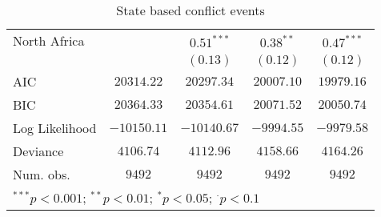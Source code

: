 \begin{sidewaystable}
\begin{center}
{\begin{tabular}{l c c c c}
North Africa                             &               & $0.51^{***}$  & $0.38^{**}$   & $0.47^{***}$    \\
                                         &               & $(0.13)$      & $(0.12)$      & $(0.12)$        \\
\midrule
AIC                                      & $20314.22$    & $20297.34$    & $20007.10$    & $19979.16$      \\
BIC                                      & $20364.33$    & $20354.61$    & $20071.52$    & $20050.74$      \\
Log Likelihood                           & $-10150.11$   & $-10140.67$   & $-9994.55$    & $-9979.58$      \\
Deviance                                 & $4106.74$     & $4112.96$     & $4158.66$     & $4164.26$       \\
Num. obs.                                & $9492$        & $9492$        & $9492$        & $9492$          \\
\bottomrule
\multicolumn{5}{l}{\scriptsize{$^{***}p<0.001$; $^{**}p<0.01$; $^{*}p<0.05$; $^{\cdot}p<0.1$}}
\end{tabular}
}
\caption{State based conflict events}
\label{state_based}
\end{center}
\end{sidewaystable}
